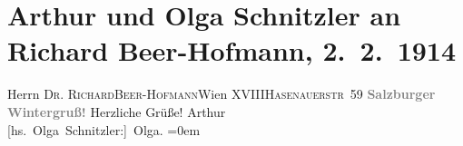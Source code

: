 

         
         \renewcommand{\erwaehntePersonen}{Personen: Richard Beer-Hofmann, Olga Schnitzler}
         \renewcommand{\erwaehnteOrte}{Orte: Hasenauerstraße, Salzburg, Wien, XVIII., Währing}
         \renewcommand{\erwaehnteWerke}{}
               \section[Arthur und Olga Schnitzler an Richard Beer-Hofmann, 2. 2. 1914]{ Arthur und Olga Schnitzler an Richard Beer-Hofmann, 2. 2. 1914}\nopagebreak{}\rehead{ }\begin{ledgroupsized}[t]{13cm}\normalsize\beginnumbering \toendnotes[C]{\smallbreak\pagebreak[2]} 
\pstart{}{\pb}Herrn \textsc{Dr. Richard}\pend{}\pstart{}\textsc{Beer-Hofmann}\pend{}\pstart{}Wien XVIII\pend{}\pstart{}\textsc{Hasenauerstr 59}\pend{}{\bigskip}\pstart
           \noindent{}\raggedleft{}{\pb}\textcolor{gray}{\textbf{Salzburger Wintergruß!}}\pend
           \pstart
           {\pb}Herzliche Grüße!\pend
           \pstart
           \spacefill\mbox{Arthur}{\\[\baselineskip]}\spacefill\mbox{{[}hs. Olga Schnitzler:{]} Olga.}\pend
           \leftskip=0em{}
         
         \endnumbering{}\end{ledgroupsized}  \newcommand{\dateiname}{L02165}\newcommand{\titel}{Arthur und Olga Schnitzler an Richard Beer-Hofmann, 2. 2. 1914}\newcommand{\editorInnen}{Martin Anton Müller und Gerd-Hermann Susen}
      